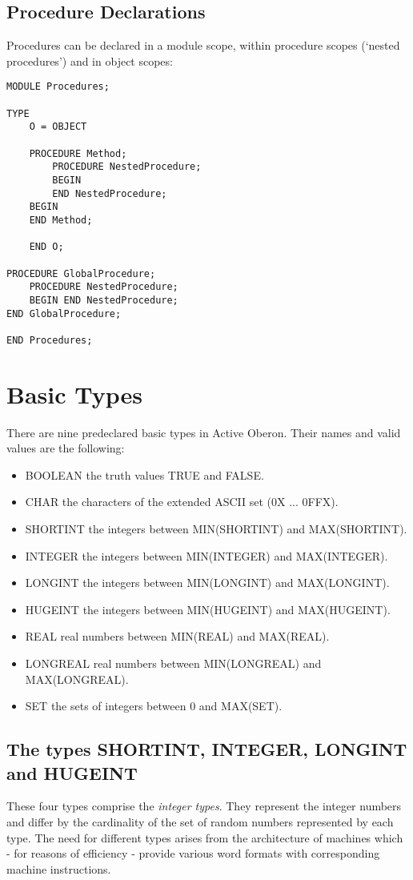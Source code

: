 \documentclass[a4paper,11pt]{article}
\begin{document}
\subsection{Procedure Declarations}
Procedures can be declared in a module scope, within procedure scopes (`nested procedures') and in object scopes:
\begin{lstlisting}[language=Oberon,frame=none,caption={Procedures}]
MODULE Procedures; 

TYPE 
    O = OBJECT
    
    PROCEDURE Method; 
        PROCEDURE NestedProcedure;
        BEGIN 
        END NestedProcedure;
    BEGIN 
    END Method; 
    
    END O; 

PROCEDURE GlobalProcedure; 
    PROCEDURE NestedProcedure; 
    BEGIN END NestedProcedure; 
END GlobalProcedure; 

END Procedures; 
\end{lstlisting}

\section{Basic Types}\label{section:BasicTypes}
There are nine predeclared basic types in Active Oberon. Their names and valid values are the following:

\begin{itemize}
\item BOOLEAN the truth values TRUE and FALSE.
\item CHAR the characters of the extended ASCII set (0X ... 0FFX).
\item SHORTINT the integers between MIN(SHORTINT) and MAX(SHORTINT).
\item INTEGER the integers between MIN(INTEGER) and MAX(INTEGER).
\item LONGINT the integers between MIN(LONGINT) and MAX(LONGINT).
\item HUGEINT the integers between MIN(HUGEINT) and MAX(HUGEINT).
\item REAL real numbers between MIN(REAL) and MAX(REAL).
\item LONGREAL real numbers between MIN(LONGREAL) and MAX(LONGREAL).
\item SET the sets of integers between 0 and MAX(SET).
\end{itemize}

\subsection{The types SHORTINT, INTEGER, LONGINT and HUGEINT}\label{subsection:IntegerTypes}
These four types comprise the {\em integer types}. They represent the integer numbers and differ by the cardinality of the set of random numbers represented by each type. The need for different types arises from the architecture of machines which - for reasons of efficiency - provide various word formats with corresponding machine instructions.
\end{document}
